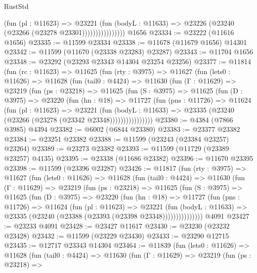 \begin{lexlean}{RustStd}
\begin{coremodule}
                          (fun (pl : @11623) =>
                          @23221
                            (fun (bodyL : @11633) =>
                            @23226 (@23240 (@23266 (@23278 @23301))))))))))))))))
    @1656
@23334 := @23222 (@11616 @1656)
@23335 := @11599 @23334
@23338 := @11678 (@11679 @1656) @14301
@23342 := @11599 (@11670 (@23338 @23283) @23287)
@23343 := @11704 @1656
@23348 := @23292 (@23293 @23343 @14304 @23254 @23256)
@23377 := @11814
    (fun (rc : @11623) =>
    @11625
      (fun (rty : @3975) =>
      @11627
        (fun (lets0 : @11626) =>
        @11628
          (fun (tail0 : @4424) =>
          @11630
            (fun (Γ : @11629) =>
            @23219
              (fun (ps : @23218) =>
              @11625
                (fun (S : @3975) =>
                @11625
                  (fun (D : @3975) =>
                  @23220
                    (fun (hn : @18) =>
                    @11727
                      (fun (pns : @11726) =>
                      @11624
                        (fun (pl : @11623) =>
                        @23221
                          (fun (bodyL : @11633) =>
                          @23335 (@23240 (@23266 (@23278 (@23342 @23348))))))))))))))))
@23380 := @4384 (@7866 @3985) @4394
@23382 := @6002 (@6844 @23380)
@23383 := @23377 @23382
@23384 := @23251 @23382
@23388 := @11599 (@23243 (@23384 @23257) @23264)
@23389 := @23273 @23382
@23393 := @11599 (@11729 (@23389 @23257) @4135)
@23395 := @23338 (@11686 @23382)
@23396 := @11670 @23395
@23398 := @11599 (@23396 @23287)
@23426 := @11817
    (fun (rty : @3975) =>
    @11627
      (fun (lets0 : @11626) =>
      @11628
        (fun (tail0 : @4424) =>
        @11630
          (fun (Γ : @11629) =>
          @23219
            (fun (ps : @23218) =>
            @11625
              (fun (S : @3975) =>
              @11625
                (fun (D : @3975) =>
                @23220
                  (fun (hn : @18) =>
                  @11727
                    (fun (pns : @11726) =>
                    @11624
                      (fun (pl : @11623) =>
                      @23221
                        (fun (bodyL : @11633) =>
                        @23335 (@23240 (@23388 (@23393 (@23398 @23348)))))))))))))))
    @4091
@23427 := @23233 @4091
@23428 := @23427 @11617
@23430 := @23230 (@23232 @23428)
@23432 := @11599 (@23229 @23430)
@23433 := @23290 @12715
@23435 := @12717 @23343 @14304
@23464 := @11839
    (fun (lets0 : @11626) =>
    @11628
      (fun (tail0 : @4424) =>
      @11630
        (fun (Γ : @11629) =>
        @23219
          (fun (ps : @23218) =>

\end{coremodule}
\end{lexlean}
